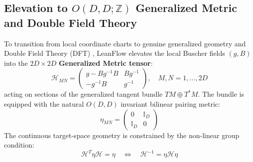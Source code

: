 \documentclass[11pt,a4paper]{article}
\begin{document}
\subsection{Elevation to $O(D, D; \mathbb{Z})$ Generalized Metric and Double Field Theory}
To transition from local coordinate charts to genuine generalized geometry and Double Field Theory (DFT) \cite{hull2009, hohm2010}, LeanFlow elevates the local Buscher fields $(g, B)$ into the $2D \times 2D$ \textbf{Generalized Metric tensor}:
\begin{equation}
\label{eq:generalized_metric}
\mathcal{H}_{MN} = \begin{pmatrix} g - B g^{-1} B & B g^{-1} \\ -g^{-1} B & g^{-1} \end{pmatrix}, \quad M, N = 1, \dots, 2D
\end{equation}
acting on sections of the generalized tangent bundle $TM \oplus T^*M$. The bundle is equipped with the natural $O(D, D)$ invariant bilinear pairing metric:
\begin{equation}
\eta_{MN} = \begin{pmatrix} 0 & \mathbb{I}_D \\ \mathbb{I}_D & 0 \end{pmatrix}
\end{equation}
The continuous target-space geometry is constrained by the non-linear group condition:
\begin{equation}
\mathcal{H}^T \eta \mathcal{H} = \eta \quad \Longleftrightarrow \quad \mathcal{H}^{-1} = \eta \mathcal{H} \eta
\end{equation}
\end{document}
